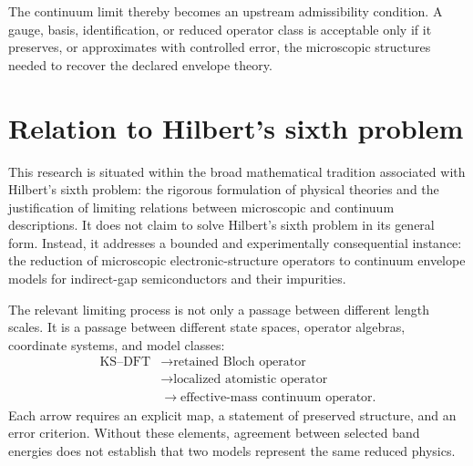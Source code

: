 
The continuum limit thereby becomes an upstream admissibility condition. A
gauge, basis, identification, or reduced operator class is acceptable only if
it preserves, or approximates with controlled error, the microscopic structures
needed to recover the declared envelope theory.

\section{Relation to Hilbert's sixth problem}


This research is situated within the broad mathematical tradition associated
with Hilbert's sixth problem: the rigorous formulation of physical theories and
the justification of limiting relations between microscopic and continuum
descriptions. It does not claim to solve Hilbert's sixth problem in its general
form. Instead, it addresses a bounded and experimentally consequential
instance: the reduction of microscopic electronic-structure operators to
continuum envelope models for indirect-gap semiconductors and their impurities.


The relevant limiting process is not only a passage between different length
scales. It is a passage between different state spaces, operator algebras,
coordinate systems, and model classes:
\begin{equation}
    \begin{aligned}
        \text{KS--DFT}
        &\longrightarrow \text{retained Bloch operator}\\
        &\longrightarrow \text{localized atomistic operator}\\
        &\longrightarrow \text{effective-mass continuum operator}.
    \end{aligned}
\end{equation}
Each arrow requires an explicit map, a statement of preserved structure, and an
error criterion. Without these elements, agreement between selected band
energies does not establish that two models represent the same reduced physics.

